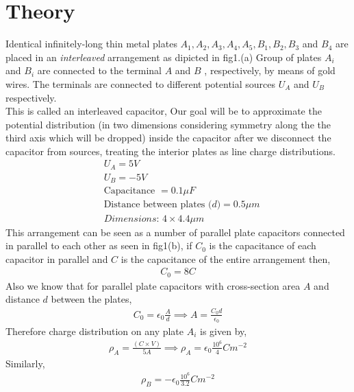 \section{Theory}
Identical infinitely-long thin metal plates $A_1,A_2,A_3,A_4,A_5,B_1,B_2,B_3 $ and $B_4$ are placed in an \textit{interleaved} arrangement as dipicted in fig1.(a) Group of plates $A_i$ and $B_i$ are connected to the terminal $A$ and $B$ , respectively, by means of gold wires. The terminals are connected to different potential sources $U_A$ and $U_B$ respectively. \\
This is called an interleaved capacitor, Our goal will be to approximate the potential distribution (in two dimensions considering symmetry along the the third axis which will be dropped) inside the capacitor after we disconnect the capacitor from sources, treating the interior plates as line charge distributions.
\begin{align*}
    &U_A = 5V \\
    &U_B = -5V \\
    &\text{Capacitance } = 0.1\mu F\\
    &\text{Distance between plates ($d$)} = 0.5\mu m \\
    &\textit{Dimensions: } 4 \times 4.4 \mu m  
\end{align*}
This arrangement can be seen as a number of parallel plate capacitors connected in parallel to each other as seen in fig1(b),
if $C_0$ is the capacitance of each capacitor in parallel and $C$ is the capacitance of the entire arrangement then,
\begin{align*}
    C_0 = 8 C
\end{align*}
Also we know that for parallel plate capacitors with cross-section area $A$ and distance $d$ between the plates,
\begin{align}
    C_0 = \epsilon_0 \frac{A}{d} \implies A = \frac{C_0d}{\epsilon_0}
\end{align}
Therefore charge distribution on any plate $A_i$ is given by,
\begin{align*}
    \rho_A = \frac{(C \times V )}{5A} \implies \rho_A = \epsilon_0\frac{10^6}{4}C m^{-2} 
\end{align*}
Similarly,
\begin{align}
    \rho_B = -\epsilon_0\frac{10^6}{3.2}C m^{-2} 
\end{align}

